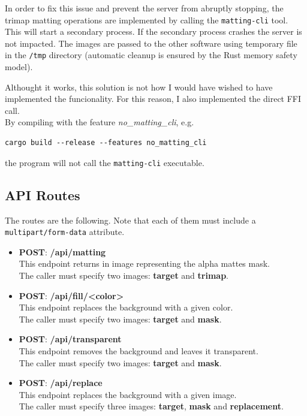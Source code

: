 \documentclass[a4paper]{article}
\begin{document}
In order to fix this issue and prevent the server from abruptly stopping,
the trimap matting operations are implemented by calling the \texttt{matting-cli}
tool. This will start a secondary process. If the secondary process crashes
the server is not impacted. The images are passed to the other software using
temporary file in the \texttt{/tmp} directory (automatic cleanup
is ensured by the Rust memory safety model).

Althought it works, this solution is not how I would have wished to have implemented
the funcionality. For this reason, I also implemented the direct FFI call. \\
By compiling with the feature \textit{no\_matting\_cli}, e.g.
\begin{lstlisting}[style=Rust, style=boxed]
    cargo build --release --features no_matting_cli
\end{lstlisting}
the program will not call the \texttt{matting-cli} executable.

\pagebreak

\subsection{API Routes}

The routes are the following.
Note that each of them must include
a \texttt{multipart/form-data} attribute.

\begin{itemize}
    \item \textbf{POST}: \textbf{/api/matting} \\
        This endpoint returns in image representing the alpha mattes mask. \\
        The caller must specify two images: \textbf{target} and \textbf{trimap}.
    \item \textbf{POST}: \textbf{/api/fill/<color>} \\
        This endpoint replaces the background with a given color. \\
        The caller must specify two images: \textbf{target} and \textbf{mask}.
    \item \textbf{POST}: \textbf{/api/transparent} \\
        This endpoint removes the background and leaves it transparent. \\
        The caller must specify two images: \textbf{target} and \textbf{mask}.
    \item \textbf{POST}: \textbf{/api/replace} \\
        This endpoint replaces the background with a given image. \\
        The caller must specify three images: \textbf{target}, \textbf{mask} and \textbf{replacement}.
\end{itemize}
\end{document}

